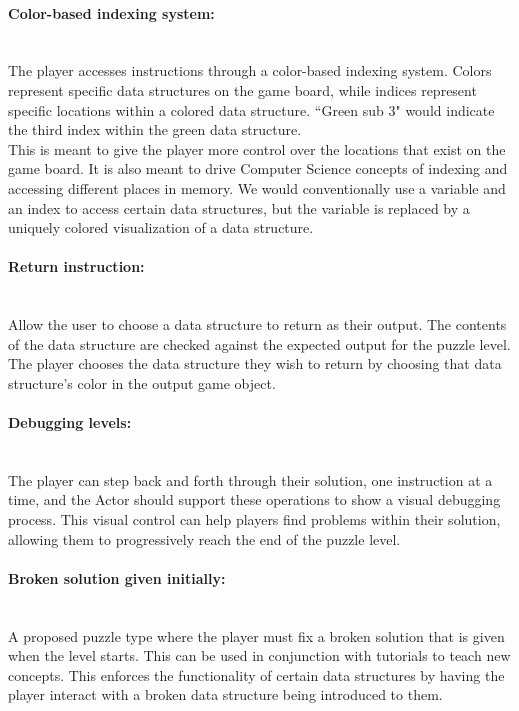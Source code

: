 \paragraph{Color-based indexing system:} ~\\
The player accesses instructions through a color-based indexing system.
Colors represent specific data structures on the game board, while indices represent
specific locations within a colored data structure. ``Green sub 3" would indicate the
third index within the green data structure.\\

This is meant to give the player more control over the locations that exist on the
game board. It is also meant to drive Computer Science concepts of indexing and accessing
different places in memory. We would conventionally use a variable and an index to access
certain data structures, but the variable is replaced by a uniquely colored visualization
of a data structure.\\

\paragraph{Return instruction:} ~\\
Allow the user to choose a data structure to return as their output. The
contents of the data structure are checked against the expected output for the
puzzle level. The player chooses the data structure they wish to return by choosing
that data structure's color in the output game object.\\

\paragraph{Debugging levels:} ~\\
The player can step back and forth through their solution, one instruction at a time,
and the Actor should support these operations to show a visual debugging process. This
visual control can help players find problems within their solution, allowing them to
progressively reach the end of the puzzle level.\\

\paragraph{Broken solution given initially:} ~\\
A proposed puzzle type where the player must fix a broken solution that is given when the level starts.
This can be used in conjunction with tutorials to teach new concepts. This enforces the functionality
of certain data structures by having the player interact with a broken data structure being
introduced to them.\\

